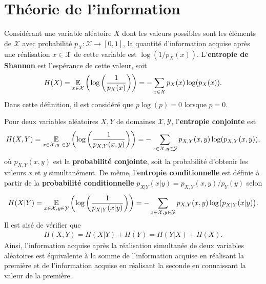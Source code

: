\begin{comment}
\end{comment}

\appendix

\chapter{Théorie de l'information}
\label{chap:theo_info}

Considérant une variable aléatoire $X$ dont les valeurs possibles sont les éléments de $\mathcal X$
avec probabilité $p_X: \mathcal X \to [0, 1]$,
la quantité d'information acquise après une réalisation $x \in \mathcal X$ de cette variable
est $\log(1/p_X(x))$.
L'\textbf{entropie de Shannon} est l'espérance de cette valeur, soit 
\begin{align}
  H(X) = \operatorname*{\mathbb{E}}_{x \in \mathcal X}\qty(\log\qty(\frac{1}{p_X(x)})) = -\sum_{x\in\mathcal X}p_X(x) \log(p_X (x)).
\end{align}
Dans cette définition,
il est considéré que $p\log(p) = 0$ lorsque $p = 0$.

Pour deux variables aléatoires $X, Y$ de domaines $\mathcal X, \mathcal Y$,
l'\textbf{entropie conjointe} est 
\begin{align}
  H(X, Y) 
  = \expec_{x\in \mathcal X, y \in \mathcal Y}
    \qty(\log\qty(\frac{1}{p_{X,Y}(x, y)})) 
  = -\sum_{x\in\mathcal X, y \in\mathcal Y}p_{X,Y}(x, y) \log(p_{X, Y}(x, y)),
\end{align}
où $p_{X, Y}(x, y)$ est la \textbf{probabilité conjointe},
soit la probabilité d'obtenir les valeurs $x$ et $y$ simultanément.
De même,
l'\textbf{entropie conditionnelle} est
définie à partir de la \textbf{probabilité conditionnelle} $p_{X | Y}(x | y) = p_{X, Y}(x, y) / p_Y(y)$
selon
\begin{align}
  H(X | Y) 
  = \operatorname*{\mathbb{E}}_{x\in\mathcal X, y \in\mathcal Y}\qty(\log\qty(\frac{1}{p_{X|Y}(x|y)})) 
  = -\sum_{x\in\mathcal X, y \in\mathcal Y}p_{X, Y}(x, y) \log(p_{X|Y}(x|y)).
\end{align}
Il est aisé de vérifier que 
\begin{align}
  H(X, Y) = H(X | Y) + H(Y) = H(Y | X) + H(X).
\end{align}
Ainsi,
l'information acquise après la réalisation simultanée de deux variables aléatoires
est équivalente à la somme de l'information acquise en réalisant la première 
et de l'information acquise en réalisant la seconde en connaissant la valeur de la première.


